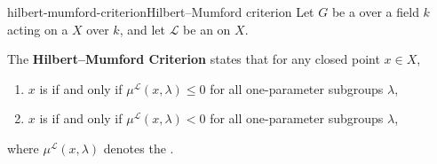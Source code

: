 \begin{topic}{hilbert-mumford-criterion}{Hilbert--Mumford criterion}
    Let $G$ be a  over a field $k$ acting on a  $X$  over $k$, and let $\mathcal{L}$ be an    on $X$.
    
    The \textbf{Hilbert--Mumford Criterion} states that for any closed point $x \in X$,
    \begin{enumerate}[label=(\roman*)]
        \item $x$ is  if and only if $\mu^\mathcal{L}(x, \lambda) \le 0$ for all one-parameter subgroups $\lambda$,
        \item $x$ is  if and only if $\mu^\mathcal{L}(x, \lambda) < 0$ for all one-parameter subgroups $\lambda$,
    \end{enumerate}
    where $\mu^\mathcal{L}(x, \lambda)$ denotes the .
\end{topic}

